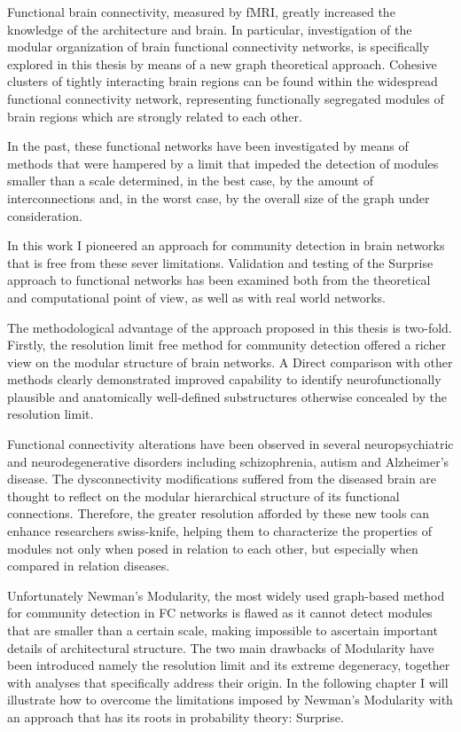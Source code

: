 Functional brain connectivity, measured by fMRI, greatly increased the knowledge of the architecture and brain.
In particular, investigation of the modular organization of brain functional connectivity networks, is specifically explored in this thesis by means of a new graph theoretical approach.
Cohesive clusters of tightly interacting brain regions can be found within the widespread functional connectivity network, representing functionally segregated modules of brain regions which are strongly related to each other.

In the past, these functional networks have been investigated by means of methods that were hampered by a limit that impeded the detection of modules smaller than a scale determined, in the best case, by the amount of interconnections and, in the worst case, by the overall size of the graph under consideration.

In this work I pioneered an approach for community detection in brain networks that is free from these sever limitations. Validation and testing of the Surprise approach to functional networks has been examined both from the theoretical and computational point of view, as well as with real world networks.

The methodological advantage of the approach proposed in this thesis is two-fold.
Firstly, the resolution limit free method for community detection offered a richer view on the modular structure of brain networks.
A 
Direct comparison with other methods clearly demonstrated improved capability to identify neurofunctionally plausible and anatomically well-defined substructures otherwise concealed by the resolution limit.

Functional connectivity alterations have been observed in several neuropsychiatric and neurodegenerative disorders including schizophrenia, autism and Alzheimer's disease. The dysconnectivity modifications suffered from the diseased brain are thought to reflect on the modular hierarchical structure of its functional connections.
Therefore, the greater resolution afforded by these new tools can enhance researchers swiss-knife, helping them to characterize the properties of modules not only when posed in relation to each other, but especially when compared in relation diseases.


 

Unfortunately Newman's Modularity, the most widely used graph-based method for community detection in FC networks is flawed as it cannot detect modules that are smaller than a certain scale, making impossible to ascertain important details of architectural structure.
The two main drawbacks of Modularity have been introduced namely the resolution limit and its extreme degeneracy, together with analyses that specifically address their origin.
In the following chapter I will illustrate how to overcome the limitations imposed by Newman's Modularity with an approach that has its roots in probability theory: Surprise.


